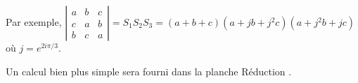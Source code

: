{{\begin{center}
\end{center}

Par exemple, $\left|
\begin{array}{ccc}
a&b&c\\
c&a&b\\
b&c&a
\end{array}
\right|=S_1S_2S_3 =(a+b+c)(a+jb+j^2c)(a+j^2b+jc)$ où $j =e^{2i\pi/3}$.

Un calcul bien plus simple sera fourni dans la planche \og Réduction \fg.}
}